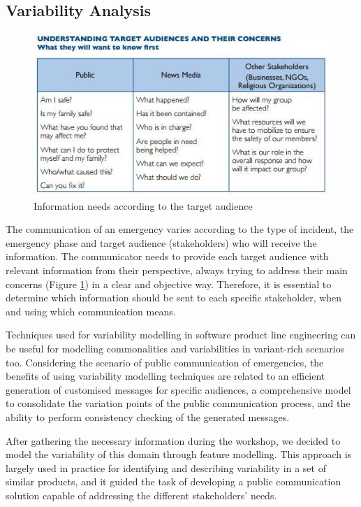 
\subsection{Variability Analysis}

\begin{figure}
\begin{center}
  \includegraphics[width=\linewidth]{images/informationsNeeds.jpg}
\caption{Information needs according to the target audience \citep{panamericanhealthorganization2009}}
\label{fig:informationNeeds}
\end{center}
\end{figure}

The communication of an emergency varies according to the type of incident, the emergency phase and target audience (stakeholders) who will receive the information. The communicator needs
to provide each target audience with relevant information from their perspective, always trying to address their main concerns (Figure \ref{fig:informationNeeds}) in a clear and objective way. Therefore, it is essential to determine which information should be sent to each specific stakeholder, when and using which communication means.

Techniques used for variability modelling in software product line engineering can be useful for modelling commonalities and variabilities in variant-rich scenarios too. Considering the scenario of public communication of emergencies, the benefits of using variability modelling techniques are related to an efficient generation of customised messages for specific audiences, a comprehensive model to consolidate the variation points of the public communication process, and the ability to perform consistency checking of the generated messages.

After gathering the necessary information during the workshop, we decided to model the variability of this domain through feature modelling. This approach is largely used in practice for identifying and describing variability in a set of similar products, and it guided the task of developing a public communication solution capable of addressing the different stakeholders’ needs. 

